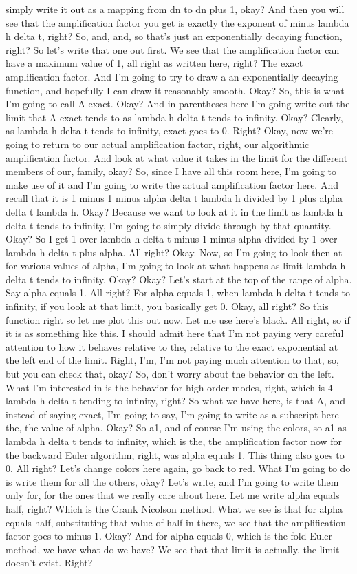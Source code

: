 \documentclass[10pt]{article}
\begin{document}
simply write it out as a mapping from dn to dn plus 1, okay? And then you will see that the amplification factor you get is exactly the exponent of minus lambda h delta t, right? So, and, and, so that's just an exponentially decaying function, right? So let's write that one out first. We see that the amplification factor can have a maximum value of 1, all right as written here, right? The exact amplification factor. And I'm going to try to draw a an exponentially decaying function, and hopefully I can draw it reasonably smooth. Okay? So, this is what I'm going to call A exact. Okay? And in parentheses here I'm going write out the limit that A exact tends to as lambda h delta t tends to infinity. Okay? Clearly, as lambda h delta t tends to infinity, exact goes to 0. Right? Okay, now we're going to return to our actual amplification factor, right, our algorithmic amplification factor. And look at what value it takes in the limit for the different members of our, family, okay? So, since I have all this room here, I'm going to make use of it and I'm going to write the actual amplification factor here. And recall that it is 1 minus 1 minus alpha delta t lambda h divided by 1 plus alpha delta t lambda h. Okay? Because we want to look at it in the limit as lambda h delta t tends to infinity, I'm going to simply divide through by that quantity. Okay? So I get 1 over lambda h delta t minus 1 minus alpha divided by 1 over lambda h delta t plus alpha. All right? Okay. Now, so I'm going to look then at for various values of alpha, I'm going to look at what happens as limit lambda h delta t tends to infinity. Okay? Okay? Let's start at the top of the range of alpha. Say alpha equals 1. All right? For alpha equals 1, when lambda h delta t tends to infinity, if you look at that limit, you basically get 0. Okay, all right? So this function right so let me plot this out now. Let me use here's black. All right, so if it is as something like this. I should admit here that I'm not paying very careful attention to how it behaves relative to the, relative to the exact exponential at the left end of the limit. Right, I'm, I'm not paying much attention to that, so, but you can check that, okay? So, don't worry about the behavior on the left. What I'm interested in is the behavior for high order modes, right, which is 4 lambda h delta t tending to infinity, right? So what we have here, is that A, and instead of saying exact, I'm going to say, I'm going to write as a subscript here the, the value of alpha. Okay? So a1, and of course I'm using the colors, so a1 as lambda h delta t tends to infinity, which is the, the amplification factor now for the backward Euler algorithm, right, was alpha equals 1. This thing also goes to 0. All right? Let's change colors here again, go back to red. What I'm going to do is write them for all the others, okay? Let's write, and I'm going to write them only for, for the ones that we really care about here. Let me write alpha equals half, right? Which is the Crank Nicolson method. What we see is that for alpha equals half, substituting that value of half in there, we see that the amplification factor goes to minus 1. Okay? And for alpha equals 0, which is the fold Euler method, we have what do we have? We see that that limit is actually, the limit doesn't exist. Right? 
\end{document}
